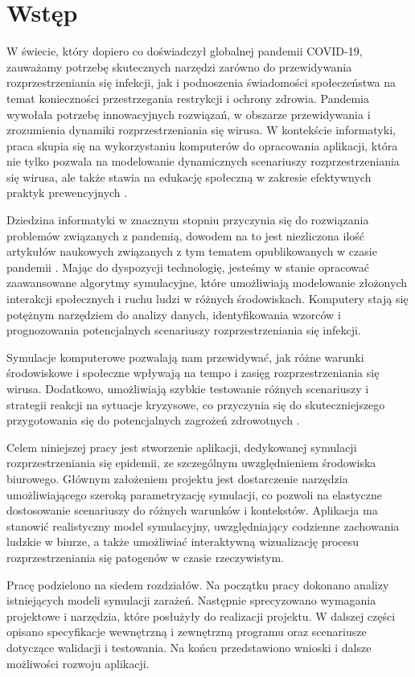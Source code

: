 \chapter*{Wstęp}
\label{Wstęp}

W świecie, który dopiero co doświadczył globalnej pandemii COVID-19, zauważamy potrzebę skutecznych narzędzi zarówno do przewidywania rozprzestrzeniania się infekcji, jak i podnoszenia świadomości społeczeństwa na temat konieczności przestrzegania restrykcji i ochrony zdrowia. Pandemia wywołała potrzebę innowacyjnych rozwiązań, w obszarze przewidywania i zrozumienia dynamiki rozprzestrzeniania się wirusa. W kontekście informatyki, praca skupia się na wykorzystaniu komputerów do opracowania aplikacji, która nie tylko pozwala na modelowanie dynamicznych scenariuszy rozprzestrzeniania się wirusa, ale także stawia na edukację społeczną w zakresie efektywnych praktyk prewencyjnych \cite{bib:simulationforeducation}.

Dziedzina informatyki w znacznym stopniu przyczynia się do rozwiązania problemów związanych z pandemią, dowodem na to jest niezliczona ilość artykułów naukowych związanych z tym tematem opublikowanych w czasie pandemii \cite{bib:covid19}\cite{bib:covid191}\cite{bib:covid192}. Mając do dyspozycji technologię, jesteśmy w stanie opracować zaawansowane algorytmy symulacyjne, które umożliwiają modelowanie złożonych interakcji społecznych i ruchu ludzi w różnych środowiskach. Komputery stają się potężnym narzędziem do analizy danych, identyfikowania wzorców i prognozowania potencjalnych scenariuszy rozprzestrzeniania się infekcji.

Symulacje komputerowe pozwalają nam przewidywać, jak różne warunki środowiskowe i społeczne wpływają na tempo i zasięg rozprzestrzeniania się wirusa. Dodatkowo, umożliwiają szybkie testowanie różnych scenariuszy i strategii reakcji na sytuacje kryzysowe, co przyczynia się do skuteczniejszego przygotowania się do potencjalnych zagrożeń zdrowotnych \cite{bib:Brockmann2017Global}.

Celem niniejszej pracy jest stworzenie aplikacji, dedykowanej symulacji rozprzestrzeniania się epidemii, ze szczególnym uwzględnieniem środowiska biurowego. Głównym założeniem projektu jest dostarczenie narzędzia umożliwiającego szeroką parametryzację symulacji, co pozwoli na elastyczne dostosowanie scenariuszy do różnych warunków i kontekstów. Aplikacja ma stanowić realistyczny model symulacyjny, uwzględniający codzienne zachowania ludzkie w biurze, a także umożliwiać interaktywną wizualizację procesu rozprzestrzeniania się patogenów w czasie rzeczywistym.

Pracę podzielono na siedem rozdziałów. Na początku pracy dokonano analizy istniejących modeli symulacji zarażeń. Następnie sprecyzowano wymagania projektowe i narzędzia, które posłużyły do realizacji projektu. W dalszej części opisano specyfikacje wewnętrzną i zewnętrzną programu oraz scenariusze dotyczące walidacji i testowania. Na końcu  przedstawiono wnioski i dalsze możliwości rozwoju aplikacji.
